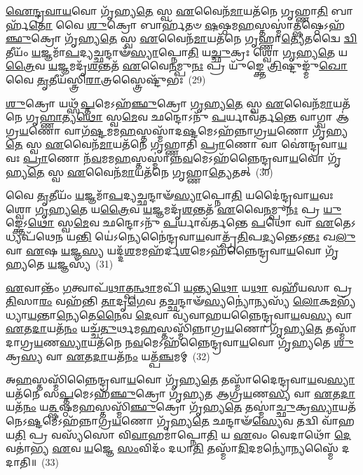 \-\ul{𑌐}\-\-\ul{𑌨𑍍𑌦𑍍𑌰}\-\-\ul{𑌵𑌾}\-\-\ul{𑌯}\-𑌵𑍋 𑌗𑍃᳴𑌹𑍍𑌯\-\ul{𑌤𑍇} 𑌸𑍍𑌵 \ul{𑌏}\-𑌵𑍈𑌨᳴\-\ul{𑌮𑌾}\-𑌯𑌤᳴𑌨𑍇 𑌗𑍃𑌹𑍍𑌣𑌾\-\ul{𑌤𑌿} 𑌬𑌾𑌰𑍍\mbox{}𑌹᳴\-\ul{𑌤𑍋} 𑌵𑍈 \ul{𑌶𑍁}\-𑌕𑍍𑌰𑍋 𑌬𑌾𑌰𑍍\mbox{}𑌹᳴𑌤𑍞 \ul{𑌷}\-𑌷𑍍𑌠𑌮\-\ul{𑌹}\-𑌸𑍍𑌤𑌸𑍍𑌮𑌾॑\-\ul{𑌤𑍍𑌷}\-𑌷𑍍𑌠𑍇\-𑌽𑌹᳴\-\ul{𑌞𑍍𑌛𑍁}\-𑌕𑍍𑌰𑍋 𑌗𑍃᳴𑌹𑍍𑌯\-\ul{𑌤𑍇} 𑌸𑍍𑌵 \ul{𑌏}\-𑌵𑍈𑌨᳴\-\ul{𑌮𑌾}\-𑌯𑌤᳴𑌨𑍇 𑌗𑍃𑌹𑍍𑌣𑌾\-\ul{𑌤𑍍𑌯𑍇}\-𑌤𑌦𑍍𑌵𑍈 \ul{𑌦𑍍𑌵𑌿}\-𑌤𑍀𑌯𑌂᳴ \ul{𑌯}\-𑌜𑍍𑌞𑌮𑌾᳴\-\ul{𑌪}\-𑌦𑍍𑌯𑌚𑍍𑌛𑌨𑍍𑌦𑌾𑍟᳴\-\ul{𑌸𑍍𑌯𑌾}\-𑌪𑍍𑌨𑍋\-\ul{𑌤𑌿} 𑌯\-\ul{𑌚𑍍𑌛𑍁}\-𑌕𑍍𑌰𑌃 𑌶𑍍𑌵𑍋 \ul{𑌗𑍃}\-𑌹𑍍𑌯\-\ul{𑌤𑍇} 𑌯\-\ul{𑌤𑍍𑌰𑍈}\-𑌵 \ul{𑌯}\-𑌜𑍍𑌞𑌮𑌦𑍃᳴\-\ul{𑌶}\-𑌨𑍍𑌤𑌤᳴ \ul{𑌏}\-𑌵𑍈\-\ul{𑌨}\-𑌮𑍍𑌪𑍁\-\ul{𑌨𑌃} 𑌪𑍍𑌰 𑌯𑍁᳴𑌙𑍍𑌕𑍍𑌤𑍇 \ul{𑌤𑍍𑌰𑌿}\-𑌷𑍍𑌟𑍁𑌙𑍍𑌮𑍁᳴\-\ul{𑌖𑍋} 𑌵𑍈 \ul{𑌤𑍃}\-𑌤𑍀𑌯᳴𑌸𑍍𑌤𑍍𑌰𑌿\-\ul{𑌰𑌾}\-𑌤𑍍𑌰𑌸𑍍𑌤𑍍𑌰𑍈𑌷𑍍𑌟𑍁᳴𑌭𑌃~(29)

\-\ul{𑌶𑍁}\-𑌕𑍍𑌰𑍋 𑌯𑌥𑍍𑌸᳴\-\ul{𑌪𑍍𑌤}\-𑌮𑍇\-𑌽𑌹᳴\-\ul{𑌞𑍍𑌛𑍁}\-𑌕𑍍𑌰𑍋 \ul{𑌗𑍃}\-𑌹𑍍𑌯\-\ul{𑌤𑍇} 𑌸𑍍𑌵 \ul{𑌏}\-𑌵𑍈𑌨᳴\-\ul{𑌮𑌾}\-𑌯𑌤᳴𑌨𑍇 𑌗𑍃\-\ul{𑌹𑍍𑌣𑌾}\-𑌤𑍍𑌯\-\ul{𑌥𑍋} 𑌸𑍍𑌵\-\ul{𑌮𑍇}\-𑌵 𑌛𑌨𑍍𑌦𑍋\-𑌽𑌨𑍁᳴ \ul{𑌪}\-𑌰𑍍𑌯𑌾𑌵᳴𑌰𑍍𑌤\-\ul{𑌨𑍍𑌤𑍇} 𑌵𑌾𑌗𑍍𑌵𑌾 𑌆॑𑌗𑍍𑌰\-\ul{𑌯}\-𑌣𑍋 𑌵𑌾𑌗᳴\-\ul{𑌷𑍍𑌟}\-𑌮𑌮\-\ul{𑌹}\-𑌸𑍍𑌤𑌸𑍍𑌮𑌾᳴𑌦\-\ul{𑌷𑍍𑌟}\-𑌮𑍇\-𑌽𑌹᳴𑌨𑍍𑌨𑌾𑌗𑍍𑌰\-\ul{𑌯}\-𑌣𑍋 𑌗𑍃᳴𑌹𑍍𑌯\-\ul{𑌤𑍇} 𑌸𑍍𑌵 \ul{𑌏}\-𑌵𑍈𑌨᳴\-\ul{𑌮𑌾}\-𑌯𑌤᳴𑌨𑍇 𑌗𑍃𑌹𑍍𑌣𑌾𑌤𑌿 \ul{𑌪𑍍𑌰𑌾}\-𑌣𑍋 𑌵𑌾 𑌐॑𑌨𑍍𑌦𑍍𑌰𑌵𑌾\-\ul{𑌯}\-𑌵𑌃 \ul{𑌪𑍍𑌰𑌾}\-𑌣𑍋 𑌨᳴\-\ul{𑌵}\-𑌮𑌮\-\ul{𑌹}\-𑌸𑍍𑌤𑌸𑍍𑌮𑌾॑𑌨𑍍𑌨\-\ul{𑌵}\-𑌮𑍇\-𑌽𑌹᳴𑌨𑍍𑌨𑍈𑌨𑍍𑌦𑍍𑌰𑌵𑌾\-\ul{𑌯}\-𑌵𑍋 𑌗𑍃᳴𑌹𑍍𑌯\-\ul{𑌤𑍇} 𑌸𑍍𑌵 \ul{𑌏}\-𑌵𑍈𑌨᳴\-\ul{𑌮𑌾}\-𑌯𑌤᳴𑌨𑍇 𑌗𑍃𑌹𑍍𑌣𑌾\-\ul{𑌤𑍍𑌯𑍇}\-𑌤𑌤𑍍~(30)

𑌵𑍈 \ul{𑌤𑍃}\-𑌤𑍀𑌯𑌂᳴ \ul{𑌯}\-𑌜𑍍𑌞𑌮𑌾᳴\-\ul{𑌪}\-𑌦𑍍𑌯𑌚𑍍𑌛𑌨𑍍𑌦𑌾𑍟᳴\-\ul{𑌸𑍍𑌯𑌾}\-𑌪𑍍𑌨𑍋\-\ul{𑌤𑌿} 𑌯𑌦𑍈॑𑌨𑍍𑌦𑍍𑌰𑌵𑌾\-\ul{𑌯}\-𑌵𑌃 𑌶𑍍𑌵𑍋 \ul{𑌗𑍃}\-𑌹𑍍𑌯\-\ul{𑌤𑍇} 𑌯\-\ul{𑌤𑍍𑌰𑍈}\-𑌵 \ul{𑌯}\-𑌜𑍍𑌞𑌮𑌦𑍃᳴\-\ul{𑌶}\-𑌨𑍍𑌤𑌤᳴ \ul{𑌏}\-𑌵𑍈\-\ul{𑌨}\-𑌮𑍍𑌪𑍁\-\ul{𑌨𑌃} 𑌪𑍍𑌰 \ul{𑌯𑍁}\-𑌙𑍍𑌕𑍍𑌤𑍇\-𑌽\-\ul{𑌥𑍋} 𑌸𑍍𑌵\-\ul{𑌮𑍇}\-𑌵 𑌛𑌨𑍍𑌦𑍋\-𑌽𑌨𑍁᳴ \ul{𑌪}\-𑌰𑍍𑌯𑌾𑌵᳴𑌰𑍍𑌤𑌨𑍍𑌤𑍇 \ul{𑌪}\-𑌥𑍋 𑌵𑌾 \ul{𑌏}\-𑌤𑍇\-𑌽𑌧𑍍𑌯𑌪᳴𑌥𑍇𑌨 𑌯\-\ul{𑌨𑍍𑌤𑌿} 𑌯𑍇॑\-𑌽𑌨𑍍𑌯𑍇𑌨𑍈॑𑌨𑍍𑌦𑍍𑌰𑌵𑌾\-\ul{𑌯}\-𑌵𑌾𑌤𑍍𑌪𑍍𑌰᳴\-\ul{𑌤𑌿}\-𑌪\-\ul{𑌦𑍍𑌯}\-𑌨𑍍𑌤𑍇\-𑌽\-\ul{𑌨𑍍𑌤𑌃} 𑌖\-\ul{𑌲𑍁} 𑌵𑌾 \ul{𑌏}\-𑌷 \ul{𑌯}\-𑌜𑍍𑌞\-\ul{𑌸𑍍𑌯} 𑌯𑌦𑍍𑌦᳴\-\ul{𑌶}\-𑌮𑌮𑌹᳴𑌰𑍍𑌦\-\ul{𑌶}\-𑌮𑍇\-𑌽𑌹᳴𑌨𑍍𑌨𑍈𑌨𑍍𑌦𑍍𑌰𑌵𑌾\-\ul{𑌯}\-𑌵𑍋 𑌗𑍃᳴𑌹𑍍𑌯𑌤𑍇 \ul{𑌯}\-𑌜𑍍𑌞𑌸𑍍𑌯᳴~(31)

\-\ul{𑌏}\-𑌵𑌾𑌨𑍍𑌤𑌂᳴ \ul{𑌗}\-𑌤𑍍𑌵𑌾𑌪᳴\-\ul{𑌥𑌾}\-𑌤𑍍𑌪\-\ul{𑌨𑍍𑌥𑌾}\-𑌮𑌪𑌿᳴ \ul{𑌯}\-𑌨𑍍𑌤𑍍𑌯\-\ul{𑌥𑍋} 𑌯\-\ul{𑌥𑌾} 𑌵𑌹𑍀᳴𑌯𑌸𑌾 𑌪𑍍𑌰\-\ul{𑌤𑌿}\-𑌸𑌾\-\ul{𑌰𑌂} 𑌵𑌹᳴𑌨𑍍𑌤𑌿 \ul{𑌤𑌾}\-𑌦𑍃\-\ul{𑌗𑍇}\-𑌵 𑌤𑌚𑍍𑌛𑌨𑍍𑌦𑌾𑍟᳴\-\ul{𑌸𑍍𑌯}\-𑌨𑍍𑌯𑍋॑𑌨𑍍𑌯𑌸𑍍𑌯᳴ \ul{𑌲𑍋}\-𑌕\-\ul{𑌮}\-𑌭𑍍𑌯᳴𑌧𑍍𑌯𑌾\-\ul{𑌯}\-𑌨𑍍𑌤𑌾\-\ul{𑌨𑍍𑌯𑍇}\-𑌤𑍇\-\ul{𑌨𑍈}\-𑌵 \ul{𑌦𑍇}\-𑌵𑌾 𑌵𑍍𑌯᳴𑌵𑌾𑌹𑌯𑌨𑍍𑌨𑍈𑌨𑍍𑌦𑍍𑌰𑌵𑌾\-\ul{𑌯}\-𑌵\-\ul{𑌸𑍍𑌯} 𑌵𑌾 \ul{𑌏}\-𑌤\-\ul{𑌦𑌾}\-𑌯𑌤᳴\-\ul{𑌨𑌂} 𑌯𑌚𑍍𑌚᳴\-\ul{𑌤𑍁}\-𑌰𑍍𑌥𑌮\-\ul{𑌹}\-𑌸𑍍𑌤𑌸𑍍𑌮𑌿᳴𑌨𑍍𑌨𑌾𑌗𑍍𑌰\-\ul{𑌯}\-𑌣𑍋 𑌗𑍃᳴𑌹𑍍𑌯\-\ul{𑌤𑍇} 𑌤𑌸𑍍𑌮𑌾᳴𑌦𑌾𑌗𑍍𑌰\-\ul{𑌯}\-𑌣\-\ul{𑌸𑍍𑌯𑌾}\-𑌯𑌤᳴𑌨𑍇 𑌨\-\ul{𑌵}\-𑌮𑍇\-𑌽𑌹᳴𑌨𑍍𑌨𑍈𑌨𑍍𑌦𑍍𑌰𑌵𑌾\-\ul{𑌯}\-𑌵𑍋 𑌗𑍃᳴𑌹𑍍𑌯𑌤𑍇 \ul{𑌶𑍁}\-𑌕𑍍𑌰\-\ul{𑌸𑍍𑌯} 𑌵𑌾 \ul{𑌏}\-𑌤\-\ul{𑌦𑌾}\-𑌯𑌤᳴\-\ul{𑌨𑌂} 𑌯𑌤𑍍𑌪᳴\-\ul{𑌞𑍍𑌚}\-𑌮𑌮𑍍~(32)

𑌅\-\ul{𑌹}\-𑌸𑍍𑌤𑌸𑍍𑌮𑌿᳴𑌨𑍍𑌨𑍈𑌨𑍍𑌦𑍍𑌰𑌵𑌾\-\ul{𑌯}\-𑌵𑍋 𑌗𑍃᳴𑌹𑍍𑌯\-\ul{𑌤𑍇} 𑌤𑌸𑍍𑌮𑌾᳴𑌦𑍈𑌨𑍍𑌦𑍍𑌰𑌵𑌾\-\ul{𑌯}\-𑌵\-\ul{𑌸𑍍𑌯𑌾}\-𑌯𑌤᳴𑌨𑍇 𑌸\-\ul{𑌪𑍍𑌤}\-𑌮𑍇\-𑌽𑌹᳴\-\ul{𑌞𑍍𑌛𑍁}\-𑌕𑍍𑌰𑍋 𑌗𑍃᳴𑌹𑍍𑌯𑌤 𑌆𑌗𑍍𑌰\-\ul{𑌯}\-𑌣\-\ul{𑌸𑍍𑌯} 𑌵𑌾 \ul{𑌏}\-𑌤\-\ul{𑌦𑌾}\-𑌯𑌤᳴\-\ul{𑌨𑌂} 𑌯\-\ul{𑌤𑍍𑌷}\-𑌷𑍍𑌠𑌮\-\ul{𑌹}\-𑌸𑍍𑌤𑌸𑍍𑌮𑌿᳴\-\ul{𑌞𑍍𑌛𑍁}\-𑌕𑍍𑌰𑍋 𑌗𑍃᳴𑌹𑍍𑌯\-\ul{𑌤𑍇} 𑌤𑌸𑍍𑌮𑌾॑\-\ul{𑌚𑍍𑌛𑍁}\-𑌕𑍍𑌰\-\ul{𑌸𑍍𑌯𑌾}\-𑌯𑌤᳴𑌨𑍇\-𑌽\-\ul{𑌷𑍍𑌟}\-𑌮𑍇\-𑌽𑌹᳴𑌨𑍍𑌨𑌾𑌗𑍍𑌰\-\ul{𑌯}\-𑌣𑍋 𑌗𑍃᳴𑌹𑍍𑌯\-\ul{𑌤𑍇} 𑌛𑌨𑍍𑌦𑌾𑍟᳴\-\ul{𑌸𑍍𑌯𑍇}\-𑌵 𑌤𑌦𑍍𑌵𑌿 𑌵𑌾᳴𑌹𑌯\-\ul{𑌤𑌿} 𑌪𑍍𑌰 𑌵𑌸𑍍𑌯᳴𑌸𑍋 𑌵𑌿\-\ul{𑌵𑌾}\-𑌹𑌮𑌾॑𑌪𑍍𑌨𑍋\-\ul{𑌤𑌿} 𑌯 \ul{𑌏}\-𑌵𑌂 𑌵𑍇𑌦𑌾𑌥𑍋᳴ \ul{𑌦𑍇}\-𑌵𑌤𑌾॑𑌭𑍍𑌯 \ul{𑌏}\-𑌵 \ul{𑌯}\-𑌜𑍍𑌞𑍇 \ul{𑌸𑌂}\-𑌵𑌿𑌦𑌂᳴ 𑌦𑌧𑌾\-\ul{𑌤𑌿} 𑌤𑌸𑍍𑌮𑌾᳴\-\ul{𑌦𑌿}\-𑌦𑌮𑌨𑍍𑌯𑍋॑𑌨𑍍𑌯𑌸𑍍𑌮𑍈᳴ 𑌦𑌦𑌾𑌤𑌿॥~(33)

